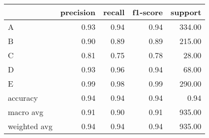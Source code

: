 \begin{tabular}{|l|r|r|r|r|}
\hline
{} &  precision &  recall &  f1-score &  support \\
\hline
A            &       0.93 &    0.94 &      0.94 &   334.00 \\
B            &       0.90 &    0.89 &      0.89 &   215.00 \\
C            &       0.81 &    0.75 &      0.78 &    28.00 \\
D            &       0.93 &    0.96 &      0.94 &    68.00 \\
E            &       0.99 &    0.98 &      0.99 &   290.00 \\
accuracy     &       0.94 &    0.94 &      0.94 &     0.94 \\
macro avg    &       0.91 &    0.90 &      0.91 &   935.00 \\
weighted avg &       0.94 &    0.94 &      0.94 &   935.00 \\
\hline
\end{tabular}
